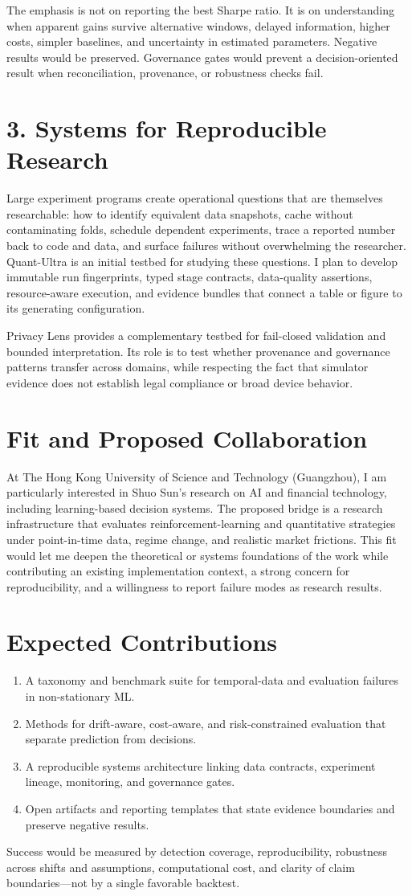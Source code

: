 \documentclass[11pt]{article}
\begin{document}
The emphasis is not on reporting the best Sharpe ratio. It is on understanding when apparent gains survive alternative windows, delayed information, higher costs, simpler baselines, and uncertainty in estimated parameters. Negative results would be preserved. Governance gates would prevent a decision-oriented result when reconciliation, provenance, or robustness checks fail.

\section*{3. Systems for Reproducible Research}
Large experiment programs create operational questions that are themselves researchable: how to identify equivalent data snapshots, cache without contaminating folds, schedule dependent experiments, trace a reported number back to code and data, and surface failures without overwhelming the researcher. Quant-Ultra is an initial testbed for studying these questions. I plan to develop immutable run fingerprints, typed stage contracts, data-quality assertions, resource-aware execution, and evidence bundles that connect a table or figure to its generating configuration.

Privacy Lens provides a complementary testbed for fail-closed validation and bounded interpretation. Its role is to test whether provenance and governance patterns transfer across domains, while respecting the fact that simulator evidence does not establish legal compliance or broad device behavior.

\section*{Fit and Proposed Collaboration}
At The Hong Kong University of Science and Technology (Guangzhou), I am particularly interested in Shuo Sun's research on AI and financial technology, including learning-based decision systems. The proposed bridge is a research infrastructure that evaluates reinforcement-learning and quantitative strategies under point-in-time data, regime change, and realistic market frictions. This fit would let me deepen the theoretical or systems foundations of the work while contributing an existing implementation context, a strong concern for reproducibility, and a willingness to report failure modes as research results.

\section*{Expected Contributions}
\begin{enumerate}
\item A taxonomy and benchmark suite for temporal-data and evaluation failures in non-stationary ML.
\item Methods for drift-aware, cost-aware, and risk-constrained evaluation that separate prediction from decisions.
\item A reproducible systems architecture linking data contracts, experiment lineage, monitoring, and governance gates.
\item Open artifacts and reporting templates that state evidence boundaries and preserve negative results.
\end{enumerate}

Success would be measured by detection coverage, reproducibility, robustness across shifts and assumptions, computational cost, and clarity of claim boundaries---not by a single favorable backtest.
\end{document}
